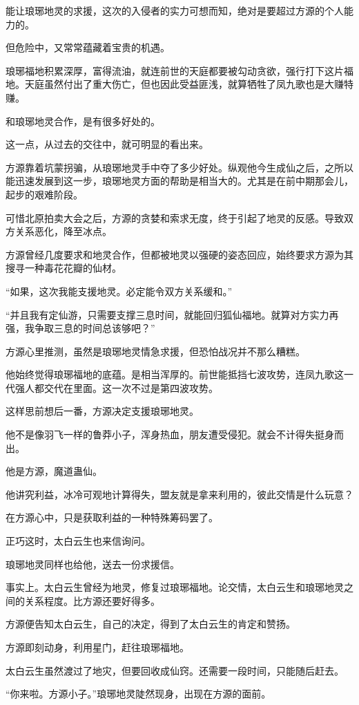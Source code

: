 \begin{this_body}
能让琅琊地灵的求援，这次的入侵者的实力可想而知，绝对是要超过方源的个人能力的。

但危险中，又常常蕴藏着宝贵的机遇。

琅琊福地积累深厚，富得流油，就连前世的天庭都要被勾动贪欲，强行打下这片福地。天庭虽然付出了重大伤亡，但也因此受益匪浅，就算牺牲了凤九歌也是大赚特赚。

和琅琊地灵合作，是有很多好处的。

这一点，从过去的交往中，就可明显的看出来。

方源靠着坑蒙拐骗，从琅琊地灵手中夺了多少好处。纵观他今生成仙之后，之所以能迅速发展到这一步，琅琊地灵方面的帮助是相当大的。尤其是在前中期那会儿，起步的艰难阶段。

可惜北原拍卖大会之后，方源的贪婪和索求无度，终于引起了地灵的反感。导致双方关系恶化，降至冰点。

方源曾经几度要求和地灵合作，但都被地灵以强硬的姿态回应，始终要求方源为其搜寻一种毒花花瓣的仙材。

“如果，这次我能支援地灵。必定能令双方关系缓和。”

“并且我有定仙游，只需要支撑三息时间，就能回归狐仙福地。就算对方实力再强，我争取三息的时间总该够吧？”

方源心里推测，虽然是琅琊地灵情急求援，但恐怕战况并不那么糟糕。

他始终觉得琅琊福地的底蕴。是相当浑厚的。前世能抵挡七波攻势，连凤九歌这一代强人都交代在里面。这一次不过是第四波攻势。

这样思前想后一番，方源决定支援琅琊地灵。

他不是像羽飞一样的鲁莽小子，浑身热血，朋友遭受侵犯。就会不计得失挺身而出。

他是方源，魔道蛊仙。

他讲究利益，冰冷可观地计算得失，盟友就是拿来利用的，彼此交情是什么玩意？

在方源心中，只是获取利益的一种特殊筹码罢了。

正巧这时，太白云生也来信询问。

琅琊地灵同样也给他，送去一份求援信。

事实上。太白云生曾经为地灵，修复过琅琊福地。论交情，太白云生和琅琊地灵之间的关系程度。比方源还要好得多。

方源便告知太白云生，自己的决定，得到了太白云生的肯定和赞扬。

方源即刻动身，利用星门，赶往琅琊福地。

太白云生虽然渡过了地灾，但要回收成仙窍。还需要一段时间，只能随后赶去。

“你来啦。方源小子。”琅琊地灵陡然现身，出现在方源的面前。


\end{this_body}
